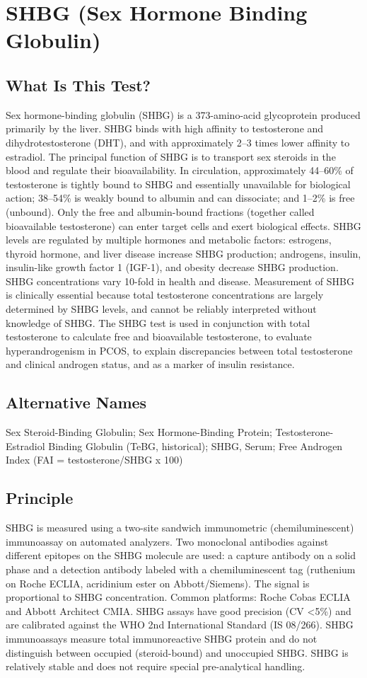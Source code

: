 \chapter{SHBG (Sex Hormone Binding Globulin)}

\section*{What Is This Test?}
Sex hormone-binding globulin (SHBG) is a 373-amino-acid glycoprotein produced primarily by the liver. SHBG binds with high affinity to testosterone and dihydrotestosterone (DHT), and with approximately 2--3 times lower affinity to estradiol. The principal function of SHBG is to transport sex steroids in the blood and regulate their bioavailability. In circulation, approximately 44--60\% of testosterone is tightly bound to SHBG and essentially unavailable for biological action; 38--54\% is weakly bound to albumin and can dissociate; and 1--2\% is free (unbound). Only the free and albumin-bound fractions (together called bioavailable testosterone) can enter target cells and exert biological effects. SHBG levels are regulated by multiple hormones and metabolic factors: estrogens, thyroid hormone, and liver disease increase SHBG production; androgens, insulin, insulin-like growth factor 1 (IGF-1), and obesity decrease SHBG production. SHBG concentrations vary 10-fold in health and disease. Measurement of SHBG is clinically essential because total testosterone concentrations are largely determined by SHBG levels, and cannot be reliably interpreted without knowledge of SHBG. The SHBG test is used in conjunction with total testosterone to calculate free and bioavailable testosterone, to evaluate hyperandrogenism in PCOS, to explain discrepancies between total testosterone and clinical androgen status, and as a marker of insulin resistance.

\section*{Alternative Names}
Sex Steroid-Binding Globulin; Sex Hormone-Binding Protein; Testosterone-Estradiol Binding Globulin (TeBG, historical); SHBG, Serum; Free Androgen Index (FAI = testosterone/SHBG x 100)

\section*{Principle}
SHBG is measured using a two-site sandwich immunometric (chemiluminescent) immunoassay on automated analyzers. Two monoclonal antibodies against different epitopes on the SHBG molecule are used: a capture antibody on a solid phase and a detection antibody labeled with a chemiluminescent tag (ruthenium on Roche ECLIA, acridinium ester on Abbott/Siemens). The signal is proportional to SHBG concentration. Common platforms: Roche Cobas ECLIA and Abbott Architect CMIA. SHBG assays have good precision (CV <5\%) and are calibrated against the WHO 2nd International Standard (IS 08/266). SHBG immunoassays measure total immunoreactive SHBG protein and do not distinguish between occupied (steroid-bound) and unoccupied SHBG. SHBG is relatively stable and does not require special pre-analytical handling.

